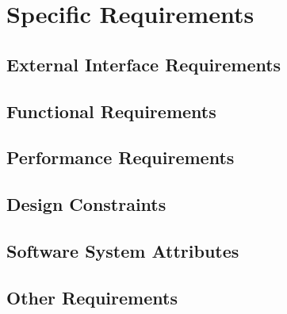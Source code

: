 \documentclass[12pt,a4paper]{article}
\begin{document}
\section{Specific Requirements}
	\subsection{External Interface Requirements}
	\subsection{Functional Requirements}
	\subsection{Performance Requirements}
	\subsection{Design Constraints}
	\subsection{Software System Attributes}
	\subsection{Other Requirements}
\end{document}

